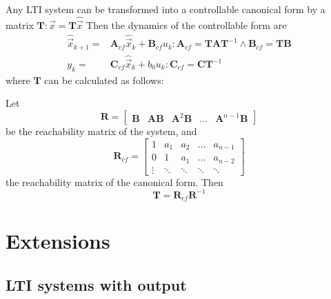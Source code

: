 \documentclass[runningheads,a4paper]{llncs}
\newcommand{\mat}[1]{\boldsymbol{#1}}
\begin{document}
Any LTI system can be transformed into a controllable canonical form by a matrix $\mat{T} : \vec{x}=\mat{T}\hat{\vec{x}}$
Then the dynamics of the controllable form are
\begin{align}
\hat{\vec{x}}_{k+1}=&\mat{A}_{cf}\hat{\vec{x}}_k+\mat{B}_{cf}u_k : \mat{A}_{cf}=\mat{T}\mat{A}\mat{T}^{-1} \wedge \mat{B}_{cf}=\mat{T}\mat{B}\\
y_k=&\mat{C}_{cf}\hat{\vec{x}}_k + b_0u_k : \mat{C}_{cf}=\mat{C}\mat{T}^{-1}\nonumber
\end{align}
where $\mat{T}$ can be calculated as follows:

Let 
\begin{equation}
\mat{R}=[\begin{array}{ccccc}\mat{B}&\mat{A}\mat{B}&\mat{A}^2\mat{B}&\hdots&\mat{A}^{n-1}\mat{B}\end{array}]
\label{eq:rncf}
\end{equation}
be the reachability matrix of the system, and
\begin{equation}
\mat{R}_{cf}=\left[\begin{array}{ccccc}1&a_1&a_2&\hdots&a_{n-1}\\0&1&a_1&\hdots&a_{n-2}\\ \vdots&\ddots&\ddots&\ddots&\ddots\end{array}\right]
\label{eq:rcf}
\end{equation}
the reachability matrix of the canonical form. Then 
\begin{equation}
\mat{T}=\mat{R}_{cf}\mat{R}^{-1}
\label{eq:to_cf}
\end{equation}


\section{Extensions}
\label{sec:extensions}

\subsection{LTI systems with output} 
\label{ssec:LTI}
\end{document}

